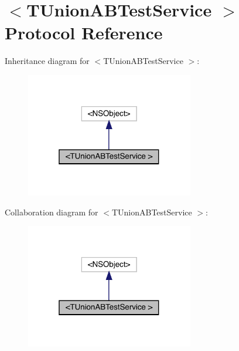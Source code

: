 \hypertarget{protocol_t_union_a_b_test_service_01-p}{}\section{$<$T\+Union\+A\+B\+Test\+Service $>$ Protocol Reference}
\label{protocol_t_union_a_b_test_service_01-p}


Inheritance diagram for $<$T\+Union\+A\+B\+Test\+Service $>$\+:\nopagebreak
\begin{figure}[H]
\begin{center}
\leavevmode
\includegraphics[width=208pt]{protocol_t_union_a_b_test_service_01-p__inherit__graph}
\end{center}
\end{figure}


Collaboration diagram for $<$T\+Union\+A\+B\+Test\+Service $>$\+:\nopagebreak
\begin{figure}[H]
\begin{center}
\leavevmode
\includegraphics[width=208pt]{protocol_t_union_a_b_test_service_01-p__coll__graph}
\end{center}
\end{figure}
